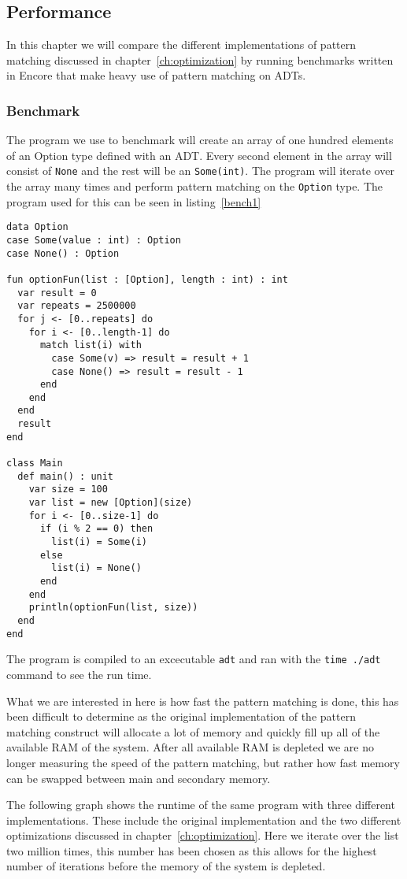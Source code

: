\documentclass[10pt]{report}
\def\code#1{\texttt{#1}} %
\begin{document}
{\subsection{Performance}
\par{In this chapter we will compare the different implementations of pattern matching discussed in chapter~\ref{ch:optimization} by running benchmarks written in Encore that make heavy use of pattern matching on ADTs.}
\subsubsection{Benchmark}
\par{The program we use to benchmark will create an array of one hundred elements of an Option type defined with an ADT. Every second element in the array will consist of \code{None} and the rest will be an \code{Some(int)}. The program will iterate over the array many times and perform pattern matching on the \code{Option} type. The program used for this can be seen in listing~\ref{bench1}}

\begin{lstlisting}[language=encore,caption={Program used for benchmarking},label=AST]
data Option
case Some(value : int) : Option
case None() : Option

fun optionFun(list : [Option], length : int) : int
  var result = 0
  var repeats = 2500000
  for j <- [0..repeats] do
    for i <- [0..length-1] do
      match list(i) with
        case Some(v) => result = result + 1
        case None() => result = result - 1
      end
    end
  end
  result
end

class Main
  def main() : unit
    var size = 100
    var list = new [Option](size)
    for i <- [0..size-1] do
      if (i % 2 == 0) then
        list(i) = Some(i)
      else
        list(i) = None()
      end
    end
    println(optionFun(list, size))
  end
end
\end{lstlisting}
\par{The program is compiled to an excecutable \code{adt} and ran with the \code{time ./adt} command to see the run time.}
\par{What we are interested in here is how fast the pattern matching is done, this has been difficult to determine as the original implementation of the pattern matching construct will allocate a lot of memory and quickly fill up all of the available RAM of the system. After all available RAM is depleted we are no longer measuring the speed of the pattern matching, but rather how fast memory can be swapped between main and secondary memory.}
\par{The following graph shows the runtime of the same program with three different implementations. These include the original implementation and the two different optimizations discussed in chapter~\ref{ch:optimization}. Here we iterate over the list two million times, this number has been chosen as this allows for the highest number of iterations before the memory of the system is depleted.}

}
\end{document}
